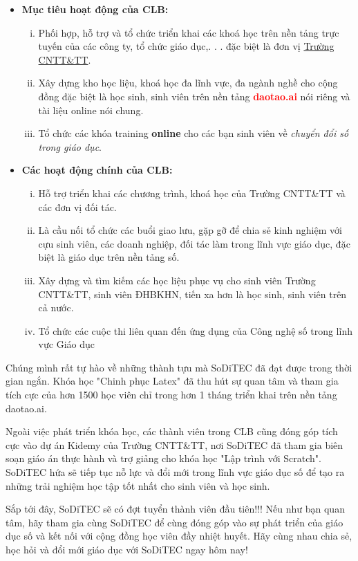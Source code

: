 \documentclass[a4paper, 12pt]{article}
\begin{document}
	\begin{itemize}
		\item \textbf{Mục tiêu hoạt động của CLB:}\\
		\begin{enumerate}[i.]
			\item Phối hợp, hỗ trợ và tổ chức triển khai các khoá học trên nền tảng
			trực tuyến của các công ty, tổ chức giáo dục,. . . đặc biệt là đơn vị
			\uline{Trường CNTT\&TT}.
			\item Xây dựng kho học liệu, khoá học đa lĩnh vực, đa ngành nghề cho
			cộng đồng đặc biệt là học sinh, sinh viên trên nền tảng \textcolor{red}{\textbf{daotao.ai}}
			nói riêng và tài liệu online nói chung. 
			\item Tổ chức các khóa training \textbf{online} cho các bạn sinh viên về \textit{chuyển
			đổi số trong giáo dục}.
		\end{enumerate}
		\item \textbf{Các hoạt động chính của CLB:}
		\begin{enumerate}[i.]
			\item Hỗ trợ triển khai các chương trình, khoá học của Trường
			CNTT\&TT và các đơn vị đối tác.
			\item Là cầu nối tổ chức các buổi giao lưu, gặp gỡ để chia sẻ kinh nghiệm
			với cựu sinh viên, các doanh nghiệp, đối tác làm trong lĩnh vực giáo
			dục, đặc biệt là giáo dục trên nền tảng số.
			\item Xây dựng và tìm kiếm các học liệu phục vụ cho sinh viên
			Trường CNTT\&TT, sinh viên ĐHBKHN, tiến xa hơn là học sinh,
			sinh viên trên cả nước.
			\item Tổ chức các cuộc thi liên quan đến ứng dụng của Công nghệ số
			trong lĩnh vực Giáo dục
		\end{enumerate}
	\end{itemize}
	\newpage
	\begin{center}
		\color{red}
		Chúng mình rất tự hào về những thành tựu mà SoDiTEC đã đạt được trong
		thời gian ngắn. Khóa học "Chinh phục Latex" đã thu hút sự quan tâm và tham
		gia tích cực của hơn 1500 học viên chỉ trong hơn 1 tháng triển khai trên nền
		tảng daotao.ai.
	\end{center}
	\begin{flushright}
		\color{blue}
		Ngoài việc phát triển khóa học, các thành viên trong CLB cũng đóng góp tích
		cực vào dự án Kidemy của Trường CNTT\&TT, nơi SoDiTEC đã tham gia biên
		soạn giáo án thực hành và trợ giảng cho khóa học "Lập trình với Scratch".
		SoDiTEC hứa sẽ tiếp tục nỗ lực và đổi mới trong lĩnh vực giáo dục số để tạo ra
		những trải nghiệm học tập tốt nhất cho sinh viên và học sinh.
	\end{flushright}
	\begin{flushleft}
		\color{purple}
			Sắp tới đây, SoDiTEC sẽ có đợt tuyển thành viên đầu tiên!!! Nếu như bạn quan
		tâm, hãy tham gia cùng SoDiTEC để cùng đóng góp vào sự phát triển của giáo
		dục số và kết nối với cộng đồng học viên đầy nhiệt huyết. Hãy cùng nhau chia
		sẻ, học hỏi và đổi mới giáo dục với SoDiTEC ngay hôm nay!
	\end{flushleft}
\end{document}
